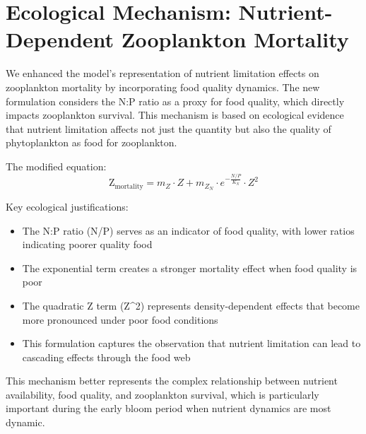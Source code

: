 \section{Ecological Mechanism: Nutrient-Dependent Zooplankton Mortality}

We enhanced the model's representation of nutrient limitation effects on zooplankton mortality by incorporating food quality dynamics. The new formulation considers the N:P ratio as a proxy for food quality, which directly impacts zooplankton survival. This mechanism is based on ecological evidence that nutrient limitation affects not just the quantity but also the quality of phytoplankton as food for zooplankton.

The modified equation:
\[
\text{Z}_{\text{mortality}} = m_Z \cdot Z + m_{Z_N} \cdot e^{-\frac{N/P}{K_N}} \cdot Z^2
\]

Key ecological justifications:
\begin{itemize}
\item The N:P ratio (N/P) serves as an indicator of food quality, with lower ratios indicating poorer quality food
\item The exponential term creates a stronger mortality effect when food quality is poor
\item The quadratic Z term (Z^2) represents density-dependent effects that become more pronounced under poor food conditions
\item This formulation captures the observation that nutrient limitation can lead to cascading effects through the food web
\end{itemize}

This mechanism better represents the complex relationship between nutrient availability, food quality, and zooplankton survival, which is particularly important during the early bloom period when nutrient dynamics are most dynamic.
